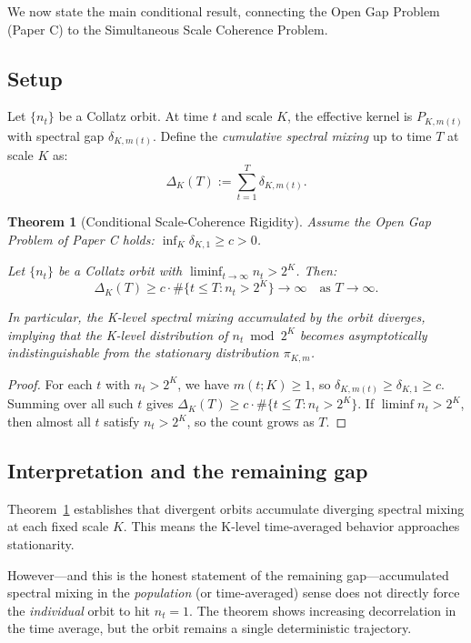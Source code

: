 \documentclass[12pt]{article}
\newtheorem{theorem}{Theorem}[section]
\theoremstyle{definition}
\begin{document}
We now state the main conditional result, connecting the Open Gap Problem (Paper C) to the Simultaneous Scale Coherence Problem.

\subsection{Setup}

Let $\{n_t\}$ be a Collatz orbit. At time $t$ and scale $K$, the effective kernel is $P_{K,m(t)}$ with spectral gap $\delta_{K,m(t)}$. Define the \emph{cumulative spectral mixing} up to time $T$ at scale $K$ as:
\[
  \Delta_K(T) := \sum_{t=1}^{T} \delta_{K,m(t)}.
\]

\begin{theorem}[Conditional Scale-Coherence Rigidity]
\label{thm:conditional}
Assume the Open Gap Problem of Paper C holds: $\inf_K \delta_{K,1} \geq c > 0$.

Let $\{n_t\}$ be a Collatz orbit with $\liminf_{t \to \infty} n_t > 2^K$. Then:
\[
  \Delta_K(T) \geq c \cdot \#\{t \leq T : n_t > 2^K\} \to \infty \quad\text{as } T \to \infty.
\]

In particular, the K-level spectral mixing accumulated by the orbit diverges, implying that the K-level distribution of $n_t \bmod 2^K$ becomes asymptotically indistinguishable from the stationary distribution $\pi_{K,m}$.
\end{theorem}

\begin{proof}
For each $t$ with $n_t > 2^K$, we have $m(t;K) \geq 1$, so $\delta_{K,m(t)} \geq \delta_{K,1} \geq c$. Summing over all such $t$ gives $\Delta_K(T) \geq c \cdot \#\{t \leq T : n_t > 2^K\}$. If $\liminf n_t > 2^K$, then almost all $t$ satisfy $n_t > 2^K$, so the count grows as $T$.
\end{proof}

\subsection{Interpretation and the remaining gap}

Theorem~\ref{thm:conditional} establishes that divergent orbits accumulate diverging spectral mixing at each fixed scale $K$. This means the K-level time-averaged behavior approaches stationarity.

However---and this is the honest statement of the remaining gap---accumulated spectral mixing in the \emph{population} (or time-averaged) sense does not directly force the \emph{individual} orbit to hit $n_t = 1$. The theorem shows increasing decorrelation in the time average, but the orbit remains a single deterministic trajectory.
\end{document}
